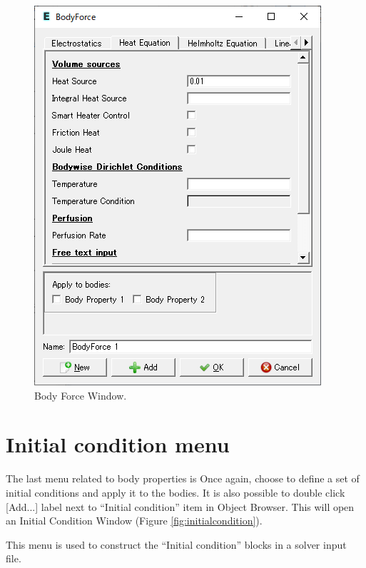 \begin{figure}[htb]
\begin{center}
 \includegraphics[scale=0.5]{images/bodyforce.png}
\caption{Body Force Window.}
\label{fig:bodyforce}
\end{center}
\end{figure}

\section{Initial condition menu}

The last menu related to body properties is
\noindent 
Once again, choose
\noindent to define a set of initial conditions and apply it to the bodies. It is also possible to double click [Add...] label next to ``Initial condition'' item in Object Browser. This will open an Initial Condition Window (Figure \ref{fig:initialcondition}).

This menu is used to construct the ``Initial condition'' blocks in a
solver input file.

